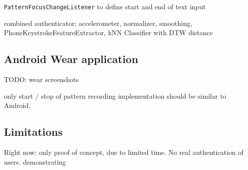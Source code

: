\lstinline$PatternFocusChangeListener$ to define start and end of text input

combined authenticator: accelerometer, normalizer, smoothing, PhoneKeystrokeFeatureExtractor, kNN Classifier with DTW distance

\subsection{Android Wear application}
TODO: wear screenshots

only start / stop of pattern recording
implementation should be similar to Android, 

\subsection{Limitations}

Right now: only proof of concept, due to limited time. No real authentication of users. demonstrating 
